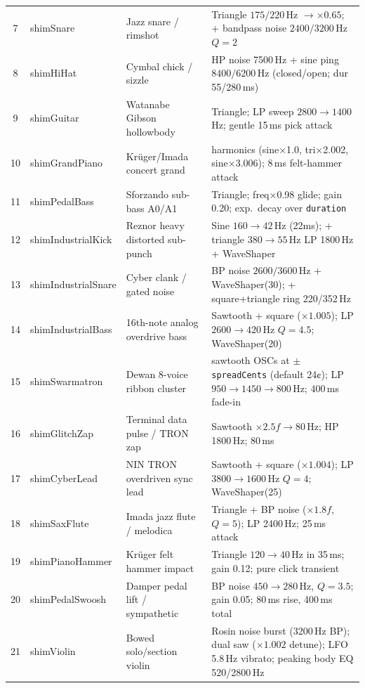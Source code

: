 \documentclass[10pt,journal,compsoc,twocolumn]{article}
\begin{document}
\begin{table}[t]
\begin{tabularx}{\textwidth}{@{}
  c
  >{\ttfamily\raggedright\arraybackslash}p{3.1cm}
  >{\raggedright\arraybackslash}p{3.4cm}
  >{\raggedright\arraybackslash}X
@{}}
7  & shimSnare        & Jazz snare / rimshot              & Triangle $175/220$\,Hz $\to \times 0.65$; + bandpass noise $2400/3200$\,Hz $Q=2$ \\
8  & shimHiHat        & Cymbal chick / sizzle             & HP noise 7500\,Hz + sine ping $8400/6200$\,Hz (closed/open; dur 55/280\,ms) \\
9  & shimGuitar       & Watanabe Gibson hollowbody        & Triangle; LP sweep $2800\to 1400$\,Hz; gentle 15\,ms pick attack \\
10 & shimGrandPiano   & Kr\"{u}ger/Imada concert grand      & 3 harmonics (sine×1.0, tri×2.002, sine×3.006); 8\,ms felt-hammer attack \\
11 & shimPedalBass    & Sforzando sub-bass A0/A1          & Triangle; freq×0.98 glide; gain 0.20; exp.\ decay over \texttt{duration} \\
12 & shimIndustrialKick & Reznor heavy distorted sub-punch & Sine $160\to 42$\,Hz (22ms); + triangle $380\to 55$\,Hz LP 1800\,Hz + WaveShaper \\
13 & shimIndustrialSnare & Cyber clank / gated noise      & BP noise $2600/3600$\,Hz + WaveShaper(30); + square+triangle ring 220/352\,Hz \\
14 & shimIndustrialBass & 16th-note analog overdrive bass & Sawtooth + square ($\times 1.005$); LP $2600\to 420$\,Hz $Q=4.5$; WaveShaper(20) \\
15 & shimSwarmatron   & Dewan 8-voice ribbon cluster      & 8 sawtooth OSCs at $\pm$\texttt{spreadCents} (default 24¢); LP $950\to 1450\to 800$\,Hz; 400\,ms fade-in \\
16 & shimGlitchZap    & Terminal data pulse / TRON zap    & Sawtooth $\times 2.5f \to 80$\,Hz; HP 1800\,Hz; 80\,ms \\
17 & shimCyberLead    & NIN TRON overdriven sync lead     & Sawtooth + square ($\times 1.004$); LP $3800\to 1600$\,Hz $Q=4$; WaveShaper(25) \\
18 & shimSaxFlute     & Imada jazz flute / melodica       & Triangle + BP noise ($\times 1.8f$, $Q=5$); LP 2400\,Hz; 25\,ms attack \\
19 & shimPianoHammer  & Kr\"{u}ger felt hammer impact       & Triangle $120\to 40$\,Hz in 35\,ms; gain 0.12; pure click transient \\
20 & shimPedalSwoosh  & Damper pedal lift / sympathetic   & BP noise $450\to 280$\,Hz, $Q=3.5$; gain 0.05; 80\,ms rise, 400\,ms total \\
21 & shimViolin       & Bowed solo/section violin         & Rosin noise burst (3200\,Hz BP); dual saw ($\times 1.002$ detune); LFO 5.8\,Hz vibrato; peaking body EQ 520/2800\,Hz \\

\end{tabularx}
\end{table}
\end{document}
